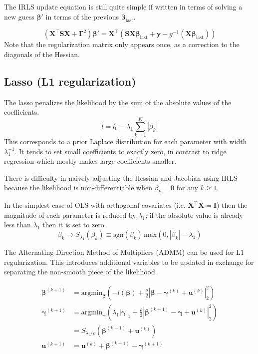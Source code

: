 \documentclass{article}
\newcommand{\bbeta}{\boldsymbol{\beta}}
\begin{document}
The IRLS update equation is still quite simple if written in terms of solving a
new guess \( \bbeta' \) in terms of the previous
\(\bbeta_\textrm{last}\).

\begin{equation}
\left( \mathbf{X}^\intercal \mathbf{S} \mathbf{X} + \boldsymbol{\Gamma}^2 \right)
\bbeta' = \mathbf{X}^\intercal \left( \mathbf{S}
\mathbf{X} \bbeta_\textrm{last} + \mathbf{y} -
g^{-1}(\mathbf{X}\bbeta_\textrm{last}) \right)
\end{equation}
Note that the regularization matrix only appears once, as a correction to the
diagonals of the Hessian.

\subsection{Lasso (L1 regularization)}

The lasso penalizes the likelihood by the sum of the absolute values of the coefficients.
\[ l = l_0 - \lambda_1 \sum_{k=1}^K \left| \beta_{k} \right| \]
This corresponds to a prior Laplace distribution for each parameter with width
\(\lambda_1^{-1}\). It tends to set small coefficients to exactly zero, in
contrast to ridge regression which mostly makes large coefficients smaller.

There is difficulty in naively adjusting the Hessian and Jacobian using IRLS
because the likelihood is non-differentiable when \(\beta_k = 0\) for any \(k
\geq 1\).

In the simplest case of OLS with orthogonal covariates (i.e. \(\mathbf{X}^\intercal \mathbf{X} = \mathbf{I}\)) then the magnitude of each parameter is reduced by \(\lambda_1\); if the absolute value is already less than \(\lambda_1\) then it is set to zero.
\[\beta_k \rightarrow S_{\lambda_1}\left(\beta_k\right) \equiv \textrm{sgn}(\beta_k) \, \textrm{max}\left(0, |\beta_k| - \lambda_1 \right)\]

The Alternating Direction Method of Multipliers (ADMM) can be used for L1
regularization. This introduces additional variables to be updated in exchange
for separating the non-smooth piece of the likelihood.

\begin{align}
\bbeta^{(k+1)} &= \textrm{argmin}_{\bbeta} \left( -l(\bbeta) + \frac{\rho}{2}\left| \bbeta - \boldsymbol{\gamma}^{(k)} + \mathbf{u}^{(k)} \right|_2^2 \right) \\
\boldsymbol{\gamma}^{(k+1)} &= \textrm{argmin}_{\boldsymbol{\gamma}} \left( \lambda_1 \left|\boldsymbol{\gamma}\right|_1 + \frac{\rho}{2}\left| \bbeta^{(k+1)} - \boldsymbol{\gamma} + \mathbf{u}^{(k)} \right|_2^2 \right) \\
&= S_{\lambda_1 / \rho} \left( \bbeta^{(k+1)} + \mathbf{u}^{(k)} \right) \\
\mathbf{u}^{(k+1)} &= \mathbf{u}^{(k)} + \bbeta^{(k+1)} - \boldsymbol{\gamma}^{(k+1)}
\end{align}
\end{document}
